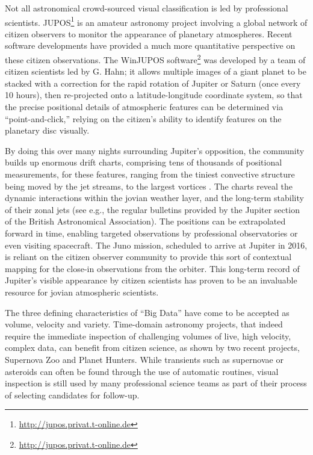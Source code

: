 \documentclass{ar2e}
\begin{document}
Not all astronomical crowd-sourced visual classification is led by 
professional scientists.
JUPOS\footnote{\url{http://jupos.privat.t-online.de}} is an amateur astronomy
project involving a global network of citizen observers to monitor the
appearance of planetary atmospheres.  Recent software developments have provided
a much more quantitative perspective on these citizen observations. The WinJUPOS
software\footnote{\url{http://jupos.privat.t-online.de}} was developed by a team
of citizen scientists led by G. Hahn; it allows multiple images of a giant
planet to be stacked with a correction for the rapid rotation of Jupiter or
Saturn  (once every 10 hours), then re-projected onto a latitude-longitude
coordinate system, so that the precise positional details of atmospheric
features can be determined via ``point-and-click,'' relying on the citizen's
ability to identify features on the planetary disc visually.  

By doing this over many nights surrounding Jupiter's opposition, the community
builds up enormous drift charts, comprising tens of thousands of positional
measurements, for these features, ranging from the tiniest convective structure
being moved by the jet streams, to the largest vortices
\citep[e.g.][]{WinJUPOSRedSpot}.  The charts reveal the dynamic interactions
within the jovian weather layer, and the long-term stability of their zonal jets
(see e.g., the regular bulletins provided by the Jupiter section of the British
Astronomical Association). The positions can be extrapolated forward in time,
enabling targeted observations by professional observatories or even visiting
spacecraft. The Juno mission, scheduled to arrive at Jupiter in 2016, is reliant
on the citizen observer community to provide this sort of contextual mapping for
the close-in observations from the orbiter.  This long-term record of Jupiter's
visible appearance by citizen scientists has proven to be an  invaluable
resource for jovian atmospheric scientists.



\label{SNZoo} 
The three defining characteristics of ``Big Data'' have come to be accepted as
volume, velocity and variety.  Time-domain astronomy projects, that indeed
require the immediate inspection of challenging volumes of live, high velocity,
complex data, can benefit from citizen science, as shown by two recent projects,
Supernova Zoo and Planet Hunters.   While transients such as supernovae or
asteroids can often be found through the use of automatic routines, visual
inspection is still used by many professional science teams as part of their
process of selecting candidates for follow-up. 
\end{document}
